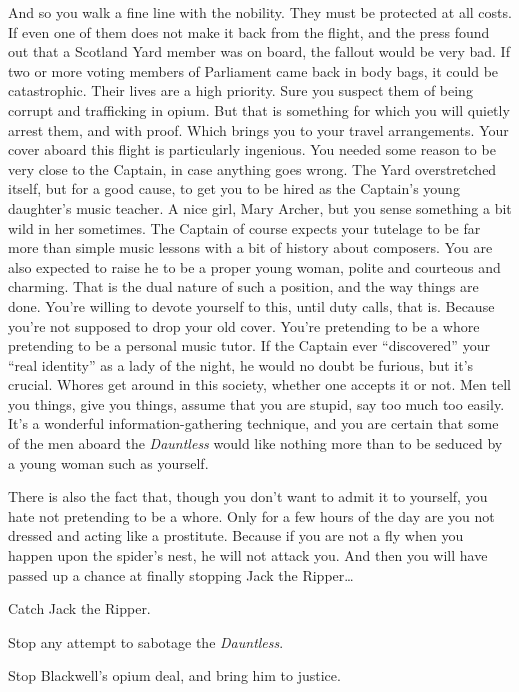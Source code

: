 \documentclass[char]{airship}
\begin{document}
And so you walk a fine line with the nobility. They must be protected at all costs. If even one of them does not make it back from the flight, and the press found out that a Scotland Yard member was on board, the fallout would be very bad. If two or more voting members of Parliament came back in body bags, it could be catastrophic. Their lives are a high priority. Sure you suspect them of being corrupt and trafficking in opium. But that is something for which you will quietly arrest them, and with proof. Which brings you to your travel arrangements. Your cover aboard this flight is particularly ingenious. You needed some reason to be very close to the Captain, in case anything goes wrong. The Yard overstretched itself, but for a good cause, to get you to be hired as the Captain's young daughter's music teacher. A nice girl, Mary Archer, but you sense something a bit wild in her sometimes. The Captain of course expects your tutelage to be far more than simple music lessons with a bit of history about composers. You are also expected to raise he to be a proper young woman, polite and courteous and charming. That is the dual nature of such a position, and the way things are done. You're willing to devote yourself to this, until duty calls, that is. Because you're not supposed to drop your old cover. You're pretending to be a whore pretending to be a personal music tutor. If the Captain ever ``discovered'' your ``real identity'' as a lady of the night, he would no doubt be furious, but it's crucial. Whores get around in this society, whether one accepts it or not. Men tell you things, give you things, assume that you are stupid, say too much too easily. It's a wonderful information-gathering technique, and you are certain that some of the men aboard the {\it Dauntless} would like nothing more than to be seduced by a young woman such as yourself.

There is also the fact that, though you don't want to admit it to yourself, you hate not pretending to be a whore. Only for a few hours of the day are you not dressed and acting like a prostitute. Because if you are not a fly when you happen upon the spider's nest, he will not attack you. And then you will have passed up a chance at finally stopping Jack the Ripper{\ldots}

\begin{itemz}[Goals]
  \item Catch Jack the Ripper.
  \item Stop any attempt to sabotage the {\em Dauntless}.
  \item Stop Blackwell's opium deal, and bring him to justice.
\end{itemz}
\end{document}
